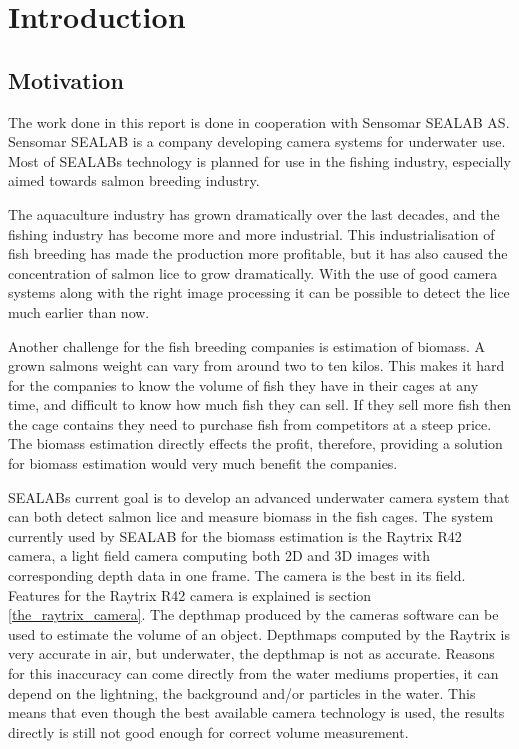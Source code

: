 \section{Introduction}\label{introduction}

\subsection{Motivation}\label{motivation}

The work done in this report is done in cooperation with Sensomar SEALAB AS.
Sensomar SEALAB is a company developing camera systems for underwater use. Most of SEALABs technology is planned for use in the fishing industry, especially aimed towards salmon breeding industry. 

The aquaculture industry has grown dramatically over the last decades, and the fishing industry has become more and more industrial. This industrialisation of fish breeding has made the production more profitable, but it has also caused the concentration of salmon lice to grow dramatically. With the use of good camera systems along with the right image processing it can be possible to detect the lice much earlier than now. 

Another challenge for the fish breeding companies is estimation of biomass. A grown salmons weight can vary from around two to ten kilos. This makes it hard for the companies to know the volume of fish they have in their cages at any time, and difficult to know how much fish they can sell. If they sell more fish then the cage contains they need to purchase fish from competitors at a steep price. The biomass estimation directly effects the profit, therefore, providing a solution for biomass estimation would very much benefit the companies. 

SEALABs current goal is to develop an advanced underwater camera system that can both detect salmon lice and measure biomass in the fish cages.
The system currently used by SEALAB for the biomass estimation is the Raytrix R42 camera, a light field camera computing both 2D and 3D images with corresponding depth data in one frame. The camera is the best in its field. Features for the Raytrix R42 camera is explained is section \ref{the_raytrix_camera}. 
The depthmap produced by the cameras software can be used to estimate the volume of an object. Depthmaps computed by the Raytrix is very accurate in air, but underwater, the depthmap is not as accurate. Reasons for this inaccuracy can come directly from the water mediums properties, it can depend on the lightning, the background and/or particles in the water. This means that even though the best available camera technology is used, the results directly is still not good enough for correct volume measurement.

